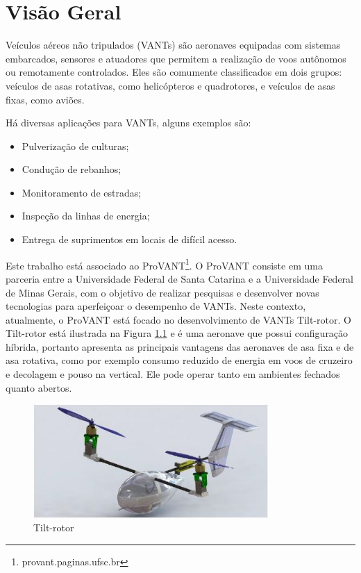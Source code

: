 \chapter{Visão Geral}


Veículos aéreos não tripulados (VANTs) são aeronaves equipadas com sistemas embarcados, sensores e atuadores que permitem a realização de voos autônomos ou remotamente controlados. Eles são comumente classificados em dois grupos: veículos de asas rotativas, como helicópteros e quadrotores, e veículos de asas fixas, como aviões. 

Há diversas aplicações para VANTs, alguns exemplos são:

\begin{itemize}
	\itemsep0em
	\item Pulverização de culturas;
	\item Condução de rebanhos;
	\item Monitoramento de estradas;
	\item Inspeção da linhas de energia;
	\item Entrega de suprimentos em locais de difícil acesso.
\end{itemize}

Este trabalho está associado ao ProVANT\footnote{provant.paginas.ufsc.br}. O ProVANT consiste em uma parceria entre a Universidade Federal de Santa Catarina e a Universidade Federal de Minas Gerais, com o objetivo de realizar pesquisas e desenvolver novas tecnologias para aperfeiçoar o desempenho de VANTs. Neste contexto, atualmente, o ProVANT está focado no desenvolvimento de VANTs Tilt-rotor.  O Tilt-rotor está ilustrada na Figura \ref{vant.jpg} e é uma aeronave que possui configuração híbrida, portanto apresenta as principais vantagens das aeronaves de asa fixa e de asa rotativa, como por exemplo consumo reduzido de energia em voos de cruzeiro e decolagem e pouso na vertical. Ele pode operar tanto em ambientes fechados quanto abertos.

\begin{figure}[!ht]
	\centering
	\includegraphics[width=0.8\textwidth]{figuras/VANT3.jpg}
	\caption{Tilt-rotor}
	\label{vant.jpg}
\end{figure}

